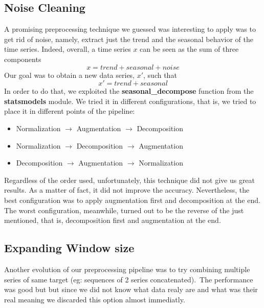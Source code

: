 \documentclass[11pt]{article}
\begin{document}
\subsection{Noise Cleaning}
A promising preprocessing technique we guessed was interesting to apply was to get rid of noise, namely, extract just the trend and the seasonal behavior of the time series. Indeed, overall, a time series $x$ can be seen as the sum of three components
\begin{equation*}
    x = trend + seasonal + noise
\end{equation*}
Our goal was to obtain a new data series, $x'$, such that
\begin{equation*}
    x' = trend + seasonal
\end{equation*}
In order to do that, we exploited the \textbf{seasonal\_decompose} function from the \textbf{statsmodels} module. We tried it in different configurations, that is, we tried to place it in different points of the pipeline:
\begin{itemize}
    \item Normalization $\rightarrow$ Augmentation $\rightarrow$ Decomposition
    \item Normalization $\rightarrow$ Decomposition $\rightarrow$ Augmentation
    \item Decomposition $\rightarrow$ Augmentation $\rightarrow$ Normalization
\end{itemize}
Regardless of the order used, unfortunately, this technique did not give us great results. As a matter of fact, it did not improve the accuracy. Nevertheless, the best configuration was to apply augmentation first and decomposition at the end. The worst configuration, meanwhile, turned out to be the reverse of the just mentioned, that is, decomposition first and augmentation at the end.
\subsection{Expanding Window size}
Another evolution of our preprocessing pipeline was to try combining multiple series of same target (eg: sequences of 2 series concatenated).\
The performance was good but  but since we did not know what data realy are and what was their real meaning we discarded this option almost immediatly.
\end{document}
